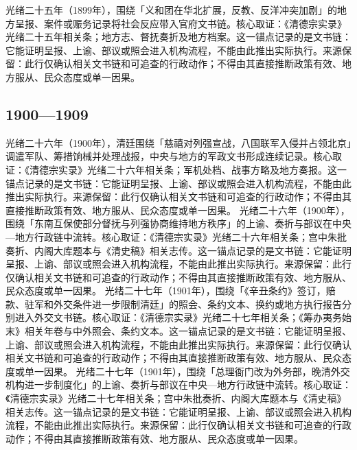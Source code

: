 光绪二十五年（1899年），围绕「义和团在华北扩展，反教、反洋冲突加剧」的地方呈报、案件或赈务记录将社会反应带入官府文书链。核心取证：《清德宗实录》光绪二十五年相关条；地方志、督抚奏折及地方档案。这一锚点记录的是文书链：它能证明呈报、上谕、部议或照会进入机构流程，不能由此推出实际执行。来源保留：此行仅确认相关文书链和可追查的行政动作；不得由其直接推断政策有效、地方服从、民众态度或单一因果。
\subsection{1900—1909}
光绪二十六年（1900年），清廷围绕「慈禧对列强宣战，八国联军入侵并占领北京」调遣军队、筹措饷械并处理战报，中央与地方的军政文书形成连续记录。核心取证：《清德宗实录》光绪二十六年相关条；军机处档、战事方略及地方奏报。这一锚点记录的是文书链：它能证明呈报、上谕、部议或照会进入机构流程，不能由此推出实际执行。来源保留：此行仅确认相关文书链和可追查的行政动作；不得由其直接推断政策有效、地方服从、民众态度或单一因果。
光绪二十六年（1900年），围绕「东南互保使部分督抚与列强协商维持地方秩序」的上谕、奏折与部议在中央—地方行政链中流转。核心取证：《清德宗实录》光绪二十六年相关条；宫中朱批奏折、内阁大库题本与《清史稿》相关志传。这一锚点记录的是文书链：它能证明呈报、上谕、部议或照会进入机构流程，不能由此推出实际执行。来源保留：此行仅确认相关文书链和可追查的行政动作；不得由其直接推断政策有效、地方服从、民众态度或单一因果。
光绪二十七年（1901年），围绕「《辛丑条约》签订，赔款、驻军和外交条件进一步限制清廷」的照会、条约文本、换约或地方执行报告分别进入外交文书链。核心取证：《清德宗实录》光绪二十七年相关条；《筹办夷务始末》相关年卷与中外照会、条约文本。这一锚点记录的是文书链：它能证明呈报、上谕、部议或照会进入机构流程，不能由此推出实际执行。来源保留：此行仅确认相关文书链和可追查的行政动作；不得由其直接推断政策有效、地方服从、民众态度或单一因果。
光绪二十七年（1901年），围绕「总理衙门改为外务部，晚清外交机构进一步制度化」的上谕、奏折与部议在中央—地方行政链中流转。核心取证：《清德宗实录》光绪二十七年相关条；宫中朱批奏折、内阁大库题本与《清史稿》相关志传。这一锚点记录的是文书链：它能证明呈报、上谕、部议或照会进入机构流程，不能由此推出实际执行。来源保留：此行仅确认相关文书链和可追查的行政动作；不得由其直接推断政策有效、地方服从、民众态度或单一因果。
